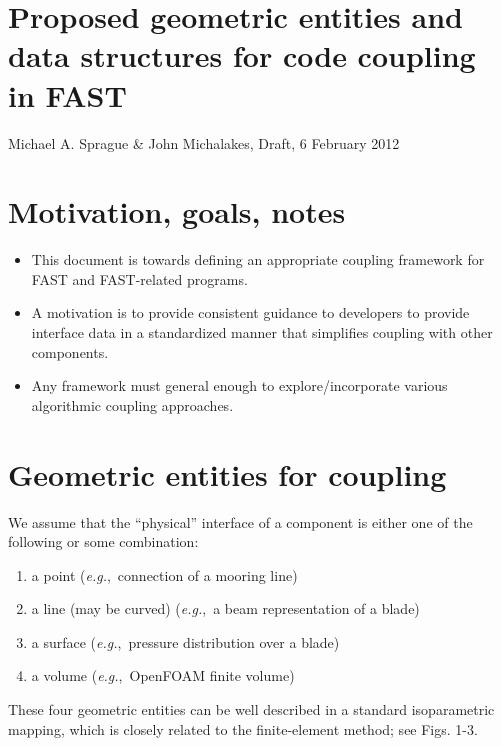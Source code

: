 \documentclass[11pt]{article}
\newcommand{\eg}{\textit{e.g.},~}
\begin{document}
  


\section*{Proposed geometric entities and data structures for code coupling
in FAST}

Michael A. Sprague \& John Michalakes, Draft, 6 February 2012

\section{Motivation, goals, notes}

\begin{itemize}

\item This document is towards defining an appropriate coupling framework
for FAST and FAST-related programs.  

\item A motivation is to provide consistent guidance to developers to
provide interface data in a standardized manner that simplifies coupling
with other components.

\item Any framework must general enough to explore/incorporate various
algorithmic coupling approaches.

\end{itemize}

\section{Geometric entities for coupling}

We assume that the ``physical'' interface of a component is either one of
the following or some combination:

\begin{enumerate} 
\item a point  (\eg  connection of a mooring line)

\item a line (may be curved) (\eg a beam representation of a blade)

\item a surface (\eg pressure distribution over a blade)

\item a volume (\eg OpenFOAM finite volume)

\end{enumerate}

These four geometric entities can be well described in a standard
isoparametric mapping, which is closely related to the finite-element
method; see Figs. 1-3.  
\end{document}
